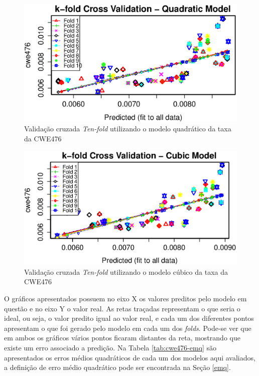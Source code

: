 \begin{figure}[h]
  \centering
  \includegraphics[width=1.0\textwidth]
      {figuras/cwe476-k-fold-quadratic.eps}
      \caption{Validação cruzada \textit{Ten-fold} utilizando o modelo
      quadrático da taxa da CWE476}
  \label{fig:cwe476-k-fold-quadratic}
\end{figure}

\begin{figure}[h]
  \centering
  \includegraphics[width=1.0\textwidth]
      {figuras/cwe476-k-fold-cubic.eps}
      \caption{Validação cruzada \textit{Ten-fold} utilizando o modelo
      cúbico da taxa da CWE476}
  \label{fig:cwe476-k-fold-cubic}
\end{figure}

O gráficos apresentados possuem no eixo X os valores preditos pelo modelo em
questão e no eixo Y o valor real. As retas traçadas representam o que seria o
ideal, ou seja, o valor predito igual ao valor real, e cada um dos diferentes
pontos apresentam o que foi gerado pelo modelo em cada um dos \textit{folds}.
Pode-se ver que em ambos os gráficos vários pontos ficaram distantes da reta,
mostrando que existe um erro associado a predição. Na Tabela
\ref{tab:cwe476-emq} são apresentados os erros médios quadráticos de cada um dos
modelos aqui avaliados, a definição de erro médio quadrático pode ser encontrada
na Seção \ref{emq}.

